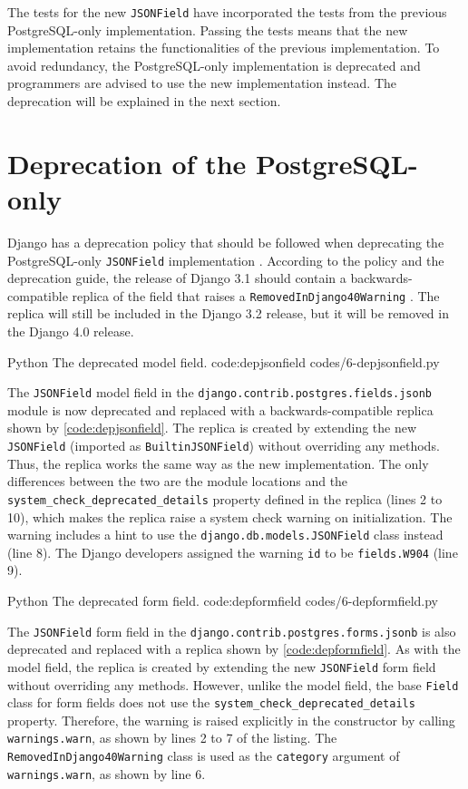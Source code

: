 The tests for the new \verb|JSONField| have incorporated the tests from the
previous PostgreSQL-only implementation. Passing the tests means that the new
implementation retains the functionalities of the previous implementation.
To avoid redundancy, the PostgreSQL-only implementation is deprecated and
programmers are advised to use the new implementation instead. The deprecation
will be explained in the next section.

\section{Deprecation of the PostgreSQL-only }

Django has a deprecation policy that should be followed when deprecating the
PostgreSQL-only \verb|JSONField| implementation
\cite{django:deprecation-policy}. According to the policy and the deprecation
guide, the release of Django 3.1 should contain a backwards-compatible replica
of the field that raises a \verb|RemovedInDjango40Warning|
\cite{django:deprecation-guide}. The replica will still be included in the
Django 3.2 release, but it will be removed in the Django 4.0 release.

\listing
{Python}
{The deprecated  model field.}
{code:depjsonfield}
{codes/6-depjsonfield.py}

The \verb|JSONField| model field in the
\verb|django.contrib.postgres.fields.jsonb| module is now deprecated and
replaced with a backwards-compatible replica shown by
\autoref{code:depjsonfield}. The replica is created by extending the new
\verb|JSONField| (imported as \verb|BuiltinJSONField|) without overriding any
methods. Thus, the replica works the same way as the new implementation. The
only differences between the two are the module locations and the
\verb|system_check_deprecated_details| property defined in the replica (lines 2
to 10), which makes the replica raise a system check warning on initialization.
The warning includes a hint to use the \verb|django.db.models.JSONField| class
instead (line 8). The Django developers assigned the warning \verb|id| to be
\verb|fields.W904| (line 9).

\listing
{Python}
{The deprecated  form field.}
{code:depformfield}
{codes/6-depformfield.py}

The \verb|JSONField| form field in the
\verb|django.contrib.postgres.forms.jsonb| is also deprecated and replaced with
a replica shown by \autoref{code:depformfield}. As with the model field, the
replica is created by extending the new \verb|JSONField| form field without
overriding any methods. However, unlike the model field, the base \verb|Field|
class for form fields does not use the \verb|system_check_deprecated_details|
property. Therefore, the warning is raised explicitly in the constructor by
calling \verb|warnings.warn|, as shown by lines 2 to 7 of the listing. The
\verb|RemovedInDjango40Warning| class is used as the \verb|category| argument
of \verb|warnings.warn|, as shown by line 6.

